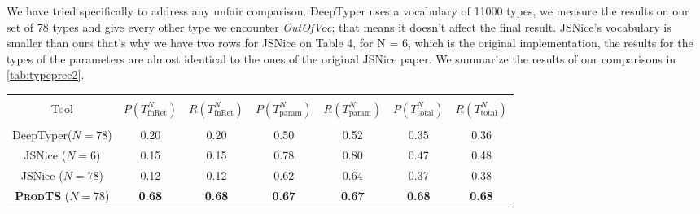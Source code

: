 \documentclass[sigplan,10pt,anonymous]{acmart} %
\newcommand{\prodts}{\textsc{ProdTS}\xspace}
\theoremstyle{plain}
\theoremstyle{remark}
\theoremstyle{definition}
\begin{document}
We have tried specifically to address any unfair comparison. DeepTyper uses a vocabulary of 11000 types, we measure the results on our set of 78 types and give every other type we encounter \textit{OutOfVoc};
that means it doesn't affect the final result. JSNice's vocabulary is smaller than ours that's why we have two rows for JSNice on Table 4, for N = 6, which is the original implementation, the results for the types of the parameters are almost identical to the ones of the original JSNice paper.
We summarize the results of our comparisons in \cref{tab:typeprec2}.

\begin{table*}[t]
  \centering
  \caption{Aggregate \textit{Type} precision and recall across all evaluated modules for DeepTyper and JSNice; as input we use 41 JavaScript libraries with 860 identifiers in total (270 funRet, 590 param).
    The superscript $N$ has the same meaning as in \cref{tab:typeprec1}, where $N = 6$ consists of the six types predicted by JSNice.
    Boldface indicates the best results of the full set of $N=78$ types.}\label{tab:typeprec2}
  \begin{tabular}{ccccccc}
    \toprule                                                                                                                                                                         \\
    Tool                             & $P(T^N_\text{fnRet})$ & $R(T^N_\text{fnRet})$ & $P(T^N_\text{param})$ & $R(T^N_\text{param})$ & $P(T^N_\text{total})$ & $R(T^N_\text{total})$ \\
    \midrule                                                                                                                                                                         \\
    DeepTyper\tiny{($N=78$)}         & 0.20                  & 0.20                  & 0.50                  & 0.52                  & 0.35                  & 0.36                  \\

    JSNice \tiny{($N=6$)}            & 0.15                  & 0.15                  & 0.78                  & 0.80                  & 0.47                  & 0.48                  \\
    JSNice \tiny{($N=78$)}           & 0.12                  & 0.12                  & 0.62                  & 0.64                  & 0.37                  & 0.38                  \\
    \textbf{\prodts} \tiny{($N=78$)} & \textbf{0.68}         & \textbf{0.68}         & \textbf{0.67}         & \textbf{0.67}
                                     & \textbf{0.68}         & \textbf{0.68}                                                                                                         \\
    \bottomrule
  \end{tabular}
\end{table*}
\end{document}
